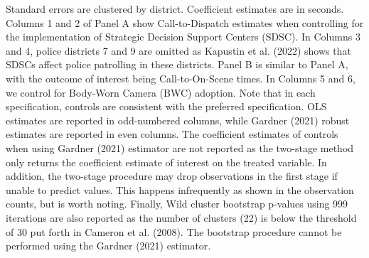 \begin{table}[H]
\begin{threeparttable}
\begin{tablenotes}
\item Standard errors are clustered by district.                      Coefficient estimates are in seconds.                      Columns 1 and 2 of Panel A show                       Call-to-Dispatch estimates when controlling for the implementation                      of Strategic                      Decision Support Centers (SDSC). In Columns 3 and 4,                       police districts 7 and 9 are omitted as Kapustin et al. (2022) shows that SDSCs                       affect                      police patrolling in these districts. Panel B is similar to Panel A,                      with the outcome of interest being Call-to-On-Scene times. In Columns 5 and 6,                      we control for Body-Worn Camera (BWC) adoption. Note that in each specification,                      controls are consistent with the preferred specification. OLS estimates are reported                      in odd-numbered columns, while Gardner (2021) robust estimates are reported in even columns.                      The coefficient estimates of controls when using Gardner (2021) estimator are not reported as the                       two-stage method only returns the coefficient estimate of interest on                      the treated variable. In addition, the two-stage procedure may drop observations                      in the first stage if unable to predict values. This happens infrequently as shown                      in the observation counts, but is worth noting. Finally,                      Wild cluster bootstrap p-values using 999 iterations are also reported                  as the number of clusters (22) is below the threshold of 30 put forth in                  Cameron et al. (2008). The bootstrap procedure cannot be performed using the Gardner (2021) estimator.                                                           
\end{tablenotes}
\end{threeparttable}
\end{table}
